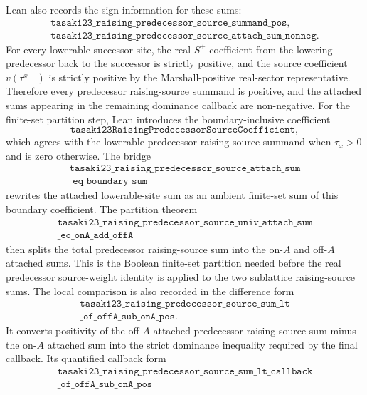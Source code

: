 \documentclass[a4paper,11pt]{article}
\begin{document}
Lean also records the sign information for these sums:
\[
\begin{gathered}
\texttt{tasaki23\_raising\_predecessor\_source\_summand\_pos},\\
\texttt{tasaki23\_raising\_predecessor\_source\_attach\_sum\_nonneg}.
\end{gathered}
\]
For every lowerable successor site, the real \(S^+\) coefficient from
the lowering predecessor back to the successor is strictly positive, and
the source coefficient \(v(\tau^{x-})\) is strictly positive by the
Marshall-positive real-sector representative.  Therefore every
predecessor raising-source summand is positive, and the attached sums
appearing in the remaining dominance callback are non-negative.
For the finite-set partition step, Lean introduces the boundary-inclusive
coefficient
\[
\texttt{tasaki23RaisingPredecessorSourceCoefficient},
\]
which agrees with the lowerable predecessor raising-source summand when
\(\tau_x>0\) and is zero otherwise.  The bridge
\[
\begin{gathered}
\texttt{tasaki23\_raising\_predecessor\_source\_attach\_sum}\\
\texttt{\_eq\_boundary\_sum}
\end{gathered}
\]
rewrites the attached lowerable-site sum as an ambient finite-set sum of
this boundary coefficient.  The partition theorem
\[
\begin{gathered}
\texttt{tasaki23\_raising\_predecessor\_source\_univ\_attach\_sum}\\
\texttt{\_eq\_onA\_add\_offA}
\end{gathered}
\]
then splits the total predecessor raising-source sum into the on-\(A\)
and off-\(A\) attached sums.  This is the Boolean finite-set partition
needed before the real predecessor source-weight identity is applied to
the two sublattice raising-source sums.
The local comparison is also recorded in the difference form
\[
\begin{gathered}
\texttt{tasaki23\_raising\_predecessor\_source\_sum\_lt}\\
\texttt{\_of\_offA\_sub\_onA\_pos}.
\end{gathered}
\]
It converts positivity of the off-\(A\) attached predecessor
raising-source sum minus the on-\(A\) attached sum into the strict
dominance inequality required by the final callback.  Its quantified
callback form
\[
\begin{gathered}
\texttt{tasaki23\_raising\_predecessor\_source\_sum\_lt\_callback}\\
\texttt{\_of\_offA\_sub\_onA\_pos}
\end{gathered}
\]
\end{document}
